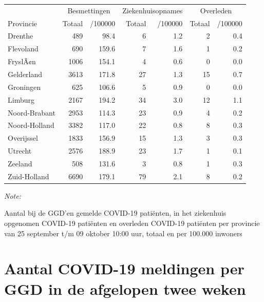\documentclass[
  english,
  man,floatsintext]{apa6}
\begin{document}
\begin{table}
\centering
\begin{threeparttable}
\begin{tabular}{lrrrrrr}
\toprule
\multicolumn{1}{c}{ } & \multicolumn{2}{c}{Besmettingen} & \multicolumn{2}{c}{Ziekenhuisopnames} & \multicolumn{2}{c}{Overleden} \\
\cmidrule(l{3pt}r{3pt}){2-3} \cmidrule(l{3pt}r{3pt}){4-5} \cmidrule(l{3pt}r{3pt}){6-7}
Provincie & Totaal & /100000 & Totaal & /100000 & Totaal & /100000\\
\midrule
Drenthe & 489 & 98.4 & 6 & 1.2 & 2 & 0.4\\
Flevoland & 690 & 159.6 & 7 & 1.6 & 1 & 0.2\\
FryslÃ¢n & 1006 & 154.1 & 4 & 0.6 & 0 & 0.0\\
Gelderland & 3613 & 171.8 & 27 & 1.3 & 15 & 0.7\\
Groningen & 625 & 106.6 & 5 & 0.9 & 0 & 0.0\\
Limburg & 2167 & 194.2 & 34 & 3.0 & 12 & 1.1\\
Noord-Brabant & 2953 & 114.3 & 23 & 0.9 & 4 & 0.2\\
Noord-Holland & 3382 & 117.0 & 22 & 0.8 & 8 & 0.3\\
Overijssel & 1833 & 156.9 & 15 & 1.3 & 3 & 0.3\\
Utrecht & 2576 & 188.9 & 23 & 1.7 & 1 & 0.1\\
Zeeland & 508 & 131.6 & 3 & 0.8 & 1 & 0.3\\
Zuid-Holland & 6690 & 179.1 & 79 & 2.1 & 8 & 0.2\\
\bottomrule
\end{tabular}
\begin{tablenotes}
\item \textit{Note: } 
\item Aantal bij de GGD’en gemelde COVID-19 patiënten, in het ziekenhuis opgenomen COVID-19 patiënten en overleden COVID-19 patiënten per provincie van 25 september t/m 09 oktober 10:00 uur, totaal en per 100.000 inwoners
\end{tablenotes}
\end{threeparttable}
\end{table}

\newpage

\hypertarget{aantal-covid-19-meldingen-per-ggd-in-de-afgelopen-twee-weken}{%
\section{Aantal COVID-19 meldingen per GGD in de afgelopen twee weken}\label{aantal-covid-19-meldingen-per-ggd-in-de-afgelopen-twee-weken}}
\end{document}
